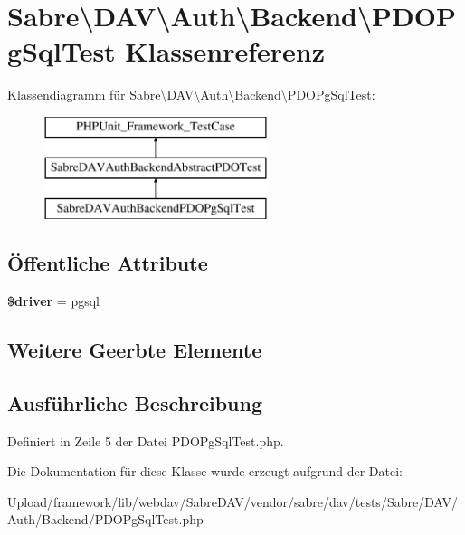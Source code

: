 \hypertarget{class_sabre_1_1_d_a_v_1_1_auth_1_1_backend_1_1_p_d_o_pg_sql_test}{}\section{Sabre\textbackslash{}D\+AV\textbackslash{}Auth\textbackslash{}Backend\textbackslash{}P\+D\+O\+Pg\+Sql\+Test Klassenreferenz}
\label{class_sabre_1_1_d_a_v_1_1_auth_1_1_backend_1_1_p_d_o_pg_sql_test}
Klassendiagramm für Sabre\textbackslash{}D\+AV\textbackslash{}Auth\textbackslash{}Backend\textbackslash{}P\+D\+O\+Pg\+Sql\+Test\+:\begin{figure}[H]
\begin{center}
\leavevmode
\includegraphics[height=3.000000cm]{class_sabre_1_1_d_a_v_1_1_auth_1_1_backend_1_1_p_d_o_pg_sql_test}
\end{center}
\end{figure}
\subsection*{Öffentliche Attribute}
\begin{DoxyCompactItemize}
\item 
\mbox{\label{class_sabre_1_1_d_a_v_1_1_auth_1_1_backend_1_1_p_d_o_pg_sql_test_a71eb3bf1d43f52b302100974b8c606a2}} 
{\bfseries \$driver} = \textquotesingle{}pgsql\textquotesingle{}
\end{DoxyCompactItemize}
\subsection*{Weitere Geerbte Elemente}


\subsection{Ausführliche Beschreibung}


Definiert in Zeile 5 der Datei P\+D\+O\+Pg\+Sql\+Test.\+php.



Die Dokumentation für diese Klasse wurde erzeugt aufgrund der Datei\+:\begin{DoxyCompactItemize}
\item 
Upload/framework/lib/webdav/\+Sabre\+D\+A\+V/vendor/sabre/dav/tests/\+Sabre/\+D\+A\+V/\+Auth/\+Backend/P\+D\+O\+Pg\+Sql\+Test.\+php\end{DoxyCompactItemize}
